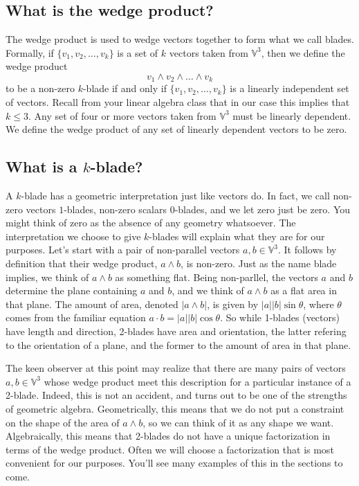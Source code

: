 \documentclass{article}
\newcommand{\V}{\mathbb{V}}
\begin{document}
\subsection{What is the wedge product?}

The wedge product is used to wedge vectors together to form what
we call blades.  Formally, if $\{v_1,v_2,\dots,v_k\}$ is a set
of $k$ vectors taken from $\V^3$, then we define the wedge product
\begin{equation*}
v_1\wedge v_2\wedge\dots\wedge v_k
\end{equation*}
to be a non-zero $k$-blade if and only if $\{v_1,v_2,\dots,v_k\}$ is
a linearly independent set of vectors.  Recall from your linear algebra
class that in our case this implies that $k\leq 3$.  Any set of four or more vectors
taken from $\V^3$ must be linearly dependent.  We define the wedge product
of any set of linearly dependent vectors to be zero.

\subsection{What is a $k$-blade?}

A $k$-blade has a geometric interpretation just like vectors do.
In fact, we call non-zero vectors $1$-blades, non-zero scalars $0$-blades,
and we let zero just be zero.  You might think of zero as the absence
of any geometry whatsoever.  The interpretation we choose to give
$k$-blades will explain what they are for our purposes.  Let's start with a pair of
non-parallel vectors $a,b\in\V^3$.  It follows by definition that
their wedge product, $a\wedge b$, is non-zero.  Just as the name blade
implies, we think of $a\wedge b$ as something flat.  Being
non-parllel, the vectors $a$ and $b$ determine the plane containing
$a$ and $b$, and we think of
$a\wedge b$ as a flat area in that plane.  The amount of area,
denoted $|a\wedge b|$, is given by $|a||b|\sin\theta$, where
$\theta$ comes from the familiar equation $a\cdot b=|a||b|\cos\theta$.
So while 1-blades (vectors) have length and direction, 2-blades have
area and orientation, the latter refering to the orientation of a plane,
and the former to the amount of area in that plane.

The keen observer at this point may realize that there are many pairs
of vectors $a,b\in\V^3$ whose wedge product meet this description for
a particular instance of a 2-blade.
Indeed, this is not an accident, and turns out to be one of the strengths
of geometric algebra.  Geometrically, this means that we do not put a
constraint on the shape of the area of $a\wedge b$, so we can think of it
as any shape we want.  Algebraically, this means that 2-blades do not have
a unique factorization in terms of the wedge product.  Often we will choose
a factorization that is most convenient for our purposes.  You'll see many examples
of this in the sections to come.
\end{document}
